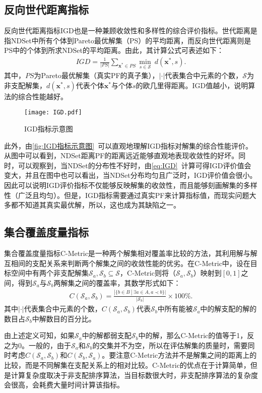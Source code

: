 \subsection{反向世代距离指标}
\label{subsec:背景介绍:性能评价指标:反向世代距离指标}
反向世代距离指标IGD也是一种兼顾收敛性和多样性的综合评价指标。世代距离是指NDSet中所有个体到Pareto最优解集（PS）的平均距离，而反向世代距离则是PS中的个体到所求NDSet的平均距离。由此，其计算公式可表述如下：
\begin{align}
    \label{eq:IGD}
    IGD = \frac{1}{|PS|} \sum_{\mathbf{x}^* \in PS} \min_{s \in \mathcal{S}} \ \mathit{d}(\mathbf{x}^*, s).
\end{align}
其中，$PS$为Pareto最优解集（真实PF的真子集），$| \cdot  \vert $代表集合中元素的个数，$\mathcal{S}$为非支配解集，$\mathit{d}(\mathbf{x}^*, s)$代表个体$\mathbf{x}^*$与个体$s$的欧几里得距离。IGD值越小，说明算法的综合性能越好。
\begin{figure}[htb]
    \texttt{[image: IGD.pdf]}
    \caption[IGD指标示意图]{IGD指标示意图}
    \label{fig:IGD指标示意图}
\end{figure}
\par
此外，由\autoref{fig:IGD指标示意图}~可以直观地理解IGD指标对解集的综合性能评价。从图中可以看到，NDSet距离PF的距离远近能够直观地表现收敛性的好坏。同时，可以观察到，当NDSet的分布性不好时，由\autoref{eq:IGD}~计算可得IGD评价值会变大，并且在图中也可以看出，当NDSet分布均匀且广泛时，IGD评价值会很小。因此可以说明IGD评价指标不仅能够反映解集的收敛性，而且能够刻画解集的多样性（广泛且均匀）。但是，IGD指标需要通过真实PF来计算指标值，而现实问题大多都不知道其真实最优解，所以，这也成为其缺陷之一。

\subsection{集合覆盖度量指标}
\label{subsec:背景介绍:性能评价指标:集合覆盖度量指标}
集合覆盖度量指标C-Metric是一种两个解集相对覆盖率比较的方法，其利用解与解互相间的支配关系来判断两个解集之间的收敛性能的优劣。在C-Metric中，设在目标空间中有两个非支配解集$\mathcal{S}_a, \mathcal{S}_b \subseteq \mathcal{S}$，C-Metric则将（$\mathcal{S}_a, \mathcal{S}_b$）映射到$[0, 1]$之间，得到$\mathcal{S}_a$与$\mathcal{S}_b$两解集之间的覆盖率，其数学形式如下：
\begin{align}
    \label{eq:C-Metric}
    C(\mathcal{S}_a, \mathcal{S}_b) = \frac{|\{ b \in B \ | \ \exists a \in A, a \prec b \}|}{|\mathcal{S}_b|} \times 100\%.
\end{align}
其中$| \cdot  \vert $代表集合中元素的个数，$C(\mathcal{S}_a, \mathcal{S}_b)$代表$\mathcal{S}_b$中所有能被$\mathcal{S}_a$中的解支配的解的数目占$\mathcal{S}_b$中解数目的百分比。
\par
由上述定义可知，如果$\mathcal{S}_a$中的解都弱支配$\mathcal{S}_b$中的解，那么C-Metric的值等于1，反之为0。一般的，由于$\mathcal{S}_a$和$\mathcal{S}_b$的交集并不为空，所以在评估解集的质量时，需要同时考虑$C(\mathcal{S}_a, \mathcal{S}_b)$和$C(\mathcal{S}_b, \mathcal{S}_a)$。要注意C-Metric方法并不是解集之间的距离上的比较，而是不同解集在支配关系上的相对比较。C-Metric的优点在于计算简单，但是计算复杂度取决于非支配排序算法，当目标数很大时，非支配排序算法的复杂度会很高，会耗费大量时间计算该指标。

